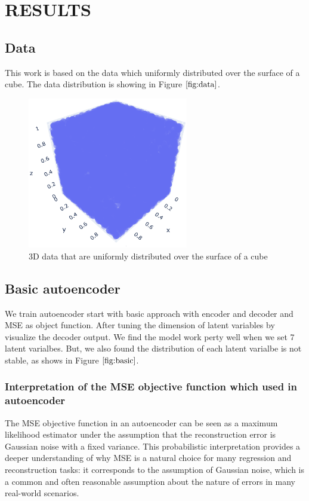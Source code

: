 \documentclass{article}
\begin{document}
\section{RESULTS}
\label{sec:results}

\subsection{Data}
\label{ssec:data}

This work is based on the data which uniformly distributed over the surface of a cube. 
The data distribution is showing in Figure $\ref{fig:data}$.

\begin{figure}[htb]
  \begin{minipage}[b]{1.0\linewidth}
    \centering
    \centerline{\includegraphics[width=7.0cm]{images/data}}
  \end{minipage}
  \caption{3D data that are uniformly distributed over the surface of a cube}
  \label{fig:data}
  \end{figure}

\subsection{Basic autoencoder}
\label{ssec:basicautoencoder}

We train autoencoder start with basic approach with encoder and decoder and MSE as object function.
After tuning the dimension of latent variables by visualize the decoder output. 
We find the model work perty well when we set 7 latent varialbes.
But, we also found the distribution of each latent varialbe is not stable, as shows in Figure $\ref{fig:basic}$.


\subsubsection{Interpretation of the MSE objective function which used in autoencoder}
\label{sssec:mse}
The MSE objective function in an autoencoder can be seen as a maximum likelihood estimator under the assumption that the reconstruction error is Gaussian noise with a fixed variance. This probabilistic interpretation provides a deeper understanding of why MSE is a natural choice for many regression and reconstruction tasks: it corresponds to the assumption of Gaussian noise, which is a common and often reasonable assumption about the nature of errors in many real-world scenarios.
\end{document}
